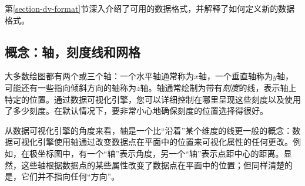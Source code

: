 第\ref{section-dv-format}节深入介绍了可用的数据格式，并解释了如何定义新的数据格式。


\subsection{概念：轴，刻度线和网格}


大多数绘图都有两个或三个轴：一个水平轴通常称为$x$轴，一个垂直轴称为$y$轴，可能还有一些指向倾斜方向的轴称为$z$轴。轴通常绘制为带有\emph{刻度}的线，表示轴上特定的位置。通过数据可视化引擎，您可以详细控制在哪里呈现这些刻度以及使用了多少刻度。在默认情况下，要非常小心地确保刻度的位置选择得很好。


从数据可视化引擎的角度来看，轴是一个比``沿着''某个维度的线更一般的概念：数据可视化引擎使用轴通过改变数据点在平面中的位置来可视化属性的任何更改。例如，在极坐标图中，有一个``轴''表示角度，另一个``轴''表示点距中心的距离。显然，这些轴根据数据点的某些属性改变了数据点在平面中的位置；但同样清楚的是，它们并不指向任何``方向''。


